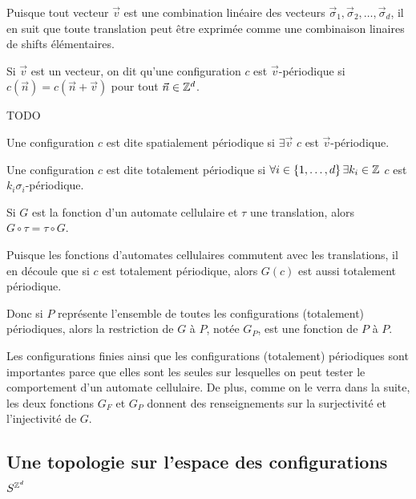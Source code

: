 Puisque tout vecteur $\vec v$ est une combination linéaire des vecteurs $\vec \sigma_1, \vec \sigma_2, \ldots, \vec \sigma_d$, il en suit que
toute translation peut être exprimée comme une combinaison linaires de shifts élémentaires.

\begin{definition}
	Si $\vec v$ est un vecteur, on dit qu'une configuration $c$ est $\vec v$-périodique si  $c(\vec n) = c (\vec n + \vec v)$ pour tout $\vec n \in \mathbb{Z} ^d$.
\end{definition}

\begin{exemple}
	TODO
\end{exemple}

\begin{definition}
	Une configuration $c$ est dite spatialement périodique si $\exists \vec v$ \tq $c$ est $\vec v$-périodique.
\end{definition}

\begin{definition}
	Une configuration $c$ est dite totalement périodique si $\forall i \in \left\{1,\ldots,d\right\}\exists k_i\in \mathbb{Z}$ \tq $c$ est $k_i\sigma_i$-périodique.
\end{definition}

\begin{prop}
	Si $G$ est la fonction d'un automate cellulaire et $\tau$ une translation, alors $G \circ \tau = \tau \circ G$.
\end{prop}

Puisque les fonctions d'automates cellulaires commutent avec les translations, il en découle que si $c$ est totalement périodique, alors $G(c)$
est aussi totalement périodique.

Donc si $P$ représente l'ensemble de toutes les configurations (totalement) périodiques, alors la restriction de $G$ à $P$,  notée $G_P$, est une fonction de $P$ à $P$.

Les configurations finies ainsi que les configurations (totalement) périodiques sont importantes parce que elles sont les seules sur
lesquelles on peut tester le comportement d'un automate cellulaire. De plus, comme on le verra dans la suite,  les deux fonctions $G_F$
et $G_P$ donnent des renseignements sur la surjectivité et l'injectivité de $G$.



\subsection{Une topologie sur l'espace des configurations $S^{\mathbb{Z}^d}$}


